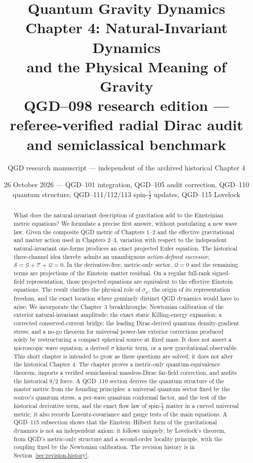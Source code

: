 \documentclass[11pt,a4paper]{article}
\title{\textbf{Quantum Gravity Dynamics}\\[6pt]
\large Chapter 4: Natural-Invariant Dynamics\\ and the Physical Meaning of Gravity\\[5pt]
\normalsize QGD--098 research edition --- referee-verified radial Dirac audit and semiclassical benchmark}
\author{QGD research manuscript --- independent of the archived historical Chapter 4}
\date{26 October 2026 --- QGD--101 integration, QGD--105 audit correction, QGD--110 quantum structure, QGD--111/112/113 spin-$\frac12$ updates, QGD--115 Lovelock}
\newcommand{\cG}{\mathscr G}
\newcommand{\cT}{\mathscr T}
\newcommand{\cQ}{\mathscr Q}
\newcommand{\cS}{\mathscr S}
\begin{document}
\maketitle
\begin{abstract}
What does the natural-invariant description of gravitation add to the
Einsteinian metric equations? We formulate a precise first answer, without
postulating a new wave law. Given the composite QGD metric of Chapters 1--2
and the effective gravitational and matter action used in Chapters 2--3,
variation with respect to the independent natural-invariant one-forms
produces an exact projected Euler equation. The historical three-channel
idea thereby admits an unambiguous \emph{action-defined successor},
$\cS=\cG+\cT+\cQ=0$. In the derivative-free, metric-only sector,
$\cQ=0$ and the remaining terms are projections of the Einstein--matter
residual. On a regular full-rank signed-field representation, those
projected equations are equivalent to the effective Einstein equations.
The result clarifies the physical role of $\sigma_\mu$, the origin of its
representation freedom, and the exact location where genuinely distinct
QGD dynamics would have to arise. We incorporate the Chapter~3 breakthroughs:
Newtonian calibration of the exterior natural-invariant amplitude; the
exact static Killing-energy expansion; a corrected conserved-current
bridge; the leading Dirac-derived quantum density-gradient stress; and a
no-go theorem for universal power-law exterior corrections produced solely
by restructuring a compact spherical source at fixed mass. It does not assert a microscopic
wave equation, a derived $\sigma$ kinetic term, or a new gravitational
observable. This short chapter is intended to grow as these questions
are solved; it does not alter the historical Chapter 4. The chapter proves a metric-only quantum-equivalence theorem, imports a
verified semiclassical massless-Dirac far-field correction, and audits the
historical $9/2$ force. A QGD--110 section derives the quantum structure of the
master metric from the founding principles: a universal quantum sector fixed by the
source's quantum stress, a per-wave quantum conformal factor, and the test of the
historical derivative term, and the exact flow law of spin-$\frac12$ matter in a curved
universal metric; it also records Lorentz-covariance and gauge tests of the main
equations. A QGD--115 subsection shows that the Einstein--Hilbert form of the
gravitational dynamics is not an independent axiom: it follows uniquely, by
Lovelock's theorem, from QGD's metric-only structure and a second-order locality
principle, with the coupling fixed by the Newtonian calibration. The revision history is in
Section~\ref{sec:revision-history}.
\end{abstract}
\end{document}
